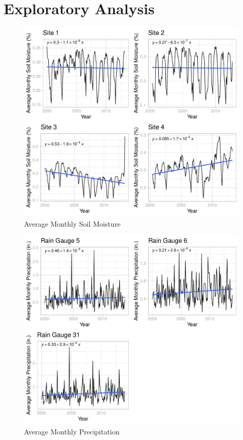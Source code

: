 \documentclass[
  12pt,
]{article}
\begin{document}
\newpage

\hypertarget{exploratory-analysis}{%
\section{Exploratory Analysis}\label{exploratory-analysis}}

\begin{figure}
\centering
\includegraphics{Project_Template_files/figure-latex/Average Monthly Soil Moisture Cowplot-1.pdf}
\caption{Average Monthly Soil Moisture}
\end{figure}

\begin{figure}
\centering
\includegraphics{Project_Template_files/figure-latex/Average Monthly Precipitation Cowplot-1.pdf}
\caption{Average Monthly Precipitation}
\end{figure}
\end{document}
